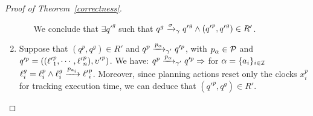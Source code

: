 \begin{proof}[Proof of Theorem~\ref{correctness}]
\begin{enumerate}
\begin{enumerate}
\begin{itemize}
         \end{itemize}
       We conclude that $\exists q'^g$ such that $q^g\xrightarrow{\sigma}_{\gamma}{q'}^g\wedge({q'}^
         p,{q'}^g)\in R'$.
  \end{enumerate}

\item Suppose that $(q^p,q^g)\in R'$ and $q^p\xrightarrow{p_{\alpha}}_{\gamma'}q'^{p}$, with 
  $p_{\alpha}\in\mathcal{P}$ and $q'^p=(({\ell'}_1^p,\cdots,{\ell'}_n^p),{\upsilon'}^p)$. We have:
      $q^p\xrightarrow{p_{\alpha}}_{\gamma'}q'^{p}\Rightarrow$ for $\alpha=\{a_i\}_{i\in\mathcal{I}}$
      $\ell_i^g=\ell_i^p\wedge\ell_i^g\xrightarrow{p_{a_i}}{\ell'}_i^p$. Moreover, since planning
      actions reset only the clocks $x_i^p$ for tracking execution time, we can deduce that
      $({q'}^p,q^g)\in R'$.
  \end{enumerate}

\end{proof}

